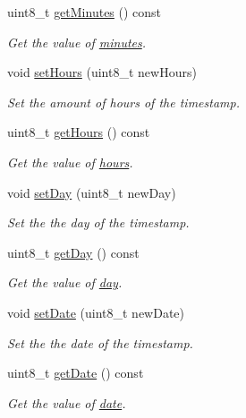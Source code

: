 \begin{DoxyCompactItemize}
uint8\+\_\+t \mbox{\hyperlink{classtimestamp_a77adde4c8da3bfc1076882f2627938f7}{get\+Minutes}} () const
\begin{DoxyCompactList}\small\item\em Get the value of \mbox{\hyperlink{classtimestamp_a45c06ef17b96bdd37cd168faf772c63c}{minutes}}. \end{DoxyCompactList}\item 
void \mbox{\hyperlink{classtimestamp_ae074684cb0c1f937c9ab985692522217}{set\+Hours}} (uint8\+\_\+t new\+Hours)
\begin{DoxyCompactList}\small\item\em Set the amount of hours of the timestamp. \end{DoxyCompactList}\item 
uint8\+\_\+t \mbox{\hyperlink{classtimestamp_a9857c77d68def8f77737f3c3840b6b95}{get\+Hours}} () const
\begin{DoxyCompactList}\small\item\em Get the value of \mbox{\hyperlink{classtimestamp_a3b2f11626563cca00d60b323ceb15191}{hours}}. \end{DoxyCompactList}\item 
void \mbox{\hyperlink{classtimestamp_af280dd8ed37274b31a548619f21dddd9}{set\+Day}} (uint8\+\_\+t new\+Day)
\begin{DoxyCompactList}\small\item\em Set the the day of the timestamp. \end{DoxyCompactList}\item 
uint8\+\_\+t \mbox{\hyperlink{classtimestamp_a70baea53133ff4b05eb49332e3ef36bb}{get\+Day}} () const
\begin{DoxyCompactList}\small\item\em Get the value of \mbox{\hyperlink{classtimestamp_a0102d6c44b2cc194a8186a42ff2bd58b}{day}}. \end{DoxyCompactList}\item 
void \mbox{\hyperlink{classtimestamp_a7392ce4abda5f63e95462bd99691b719}{set\+Date}} (uint8\+\_\+t new\+Date)
\begin{DoxyCompactList}\small\item\em Set the the date of the timestamp. \end{DoxyCompactList}\item 
uint8\+\_\+t \mbox{\hyperlink{classtimestamp_a0ee0b3188b94fd8151f4525ea0de1078}{get\+Date}} () const
\begin{DoxyCompactList}\small\item\em Get the value of \mbox{\hyperlink{classtimestamp_a7eb2eee5f6ef4258aab7779a639a93fd}{date}}. \end{DoxyCompactList}\item 

\end{DoxyCompactItemize}
